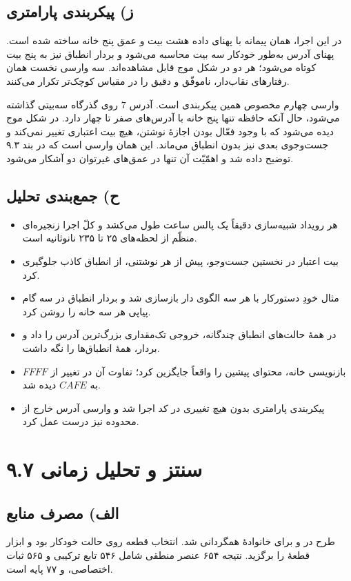 \documentclass[12pt,a4paper]{article}
\begin{document}
	\subsection*{ز) پیکربندی پارامتری}

	در این اجرا، همان پیمانه با پهنای داده هشت بیت و عمق پنج خانه ساخته شده است. پهنای آدرس به‌طور خودکار سه بیت محاسبه می‌شود و بردار انطباق نیز به پنج بیت کوتاه می‌شود؛ هر دو در شکل موج قابل مشاهده‌اند. سه وارسی نخست همان رفتارهای نقاب‌دار، ناموفّق و دقیق را در مقیاس کوچک‌تر تکرار می‌کنند.

	وارسی چهارم مخصوص همین پیکربندی است. آدرس \(7\) روی گذرگاه سه‌بیتی گذاشته می‌شود، حال آنکه حافظه تنها پنج خانه با آدرس‌های صفر تا چهار دارد. در شکل موج دیده می‌شود که با وجود فعّال بودن اجازهٔ نوشتن، هیچ بیت اعتباری تغییر نمی‌کند و جست‌وجوی بعدی نیز بدون انطباق می‌ماند. این همان وارسی  است که در بند ۹.۳ توضیح داده شد و اهمّیّت آن تنها در عمق‌های غیرتوان دو آشکار می‌شود.

	\subsection*{ح) جمع‌بندی تحلیل}
	\begin{itemize}
		\item هر رویداد شبیه‌سازی دقیقاً یک پالس ساعت طول می‌کشد و کلّ اجرا زنجیره‌ای منظّم از لحظه‌های ۲۵ تا ۲۳۵ نانوثانیه است.
		\item بیت اعتبار در نخستین جست‌وجو، پیش از هر نوشتنی، از انطباق کاذب جلوگیری کرد.
		\item مثال خودِ دستورکار با هر سه الگوی دار بازسازی شد و بردار انطباق در سه گام پیاپی هر سه خانه را روشن کرد.
		\item در همهٔ حالت‌های انطباق چندگانه، خروجی تک‌مقداری بزرگ‌ترین آدرس را داد و بردار، همهٔ انطباق‌ها را نگه داشت.
		\item بازنویسی خانه، محتوای پیشین را واقعاً جایگزین کرد؛ تفاوت آن در تغییر  از \(FFFF\) به \(CAFE\) دیده شد.
		\item پیکربندی پارامتری بدون هیچ تغییری در کد اجرا شد و وارسی آدرس خارج از محدوده نیز درست عمل کرد.
	\end{itemize}

	\section*{۹.۷ سنتز و تحلیل زمانی}
	\subsection*{الف) مصرف منابع}
	طرح در  و برای خانوادهٔ  همگردانی شد. انتخاب قطعه روی حالت خودکار بود و ابزار قطعهٔ  را برگزید. نتیجه ۶۵۴ عنصر منطقی شامل ۵۴۶ تابع ترکیبی و ۵۶۵ ثبات اختصاصی، و ۷۷ پایه است.
\end{document}
